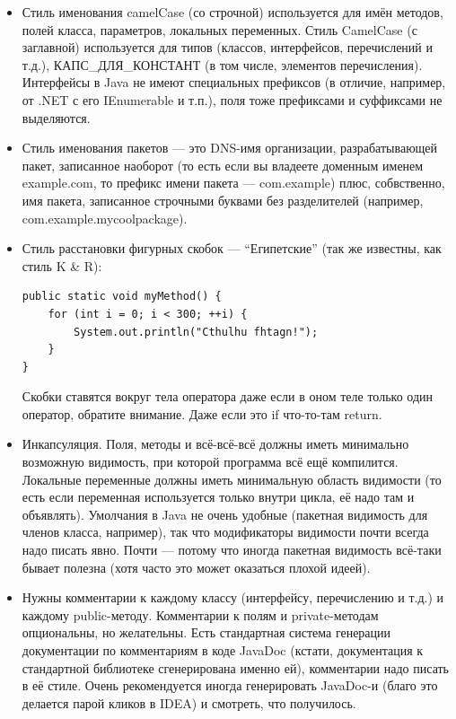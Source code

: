 \documentclass[a5paper]{article}
\begin{document}
\begin{itemize}
	\item Стиль именования camelCase (со строчной) используется для имён методов, полей класса, параметров, локальных переменных. Стиль CamelCase (с заглавной) используется для типов (классов, интерфейсов, перечислений и т.д.), КАПС\_ДЛЯ\_КОНСТАНТ (в том числе, элементов перечисления). Интерфейсы в Java не имеют специальных префиксов (в отличие, например, от .NET с его IEnumerable и т.п.), поля тоже префиксами и суффиксами не выделяются.
	\item Стиль именования пакетов --- это DNS-имя организации, разрабатывающей пакет, записанное наоборот (то есть если вы владеете доменным именем example.com, то префикс имени пакета --- com.example) плюс, собвственно, имя пакета, записанное строчными буквами без разделителей (например, com.example.mycoolpackage).
	\item Стиль расстановки фигурных скобок --- ``Египетские'' (так же известны, как стиль K \& R):
		\begin{verbatim}
public static void myMethod() {
    for (int i = 0; i < 300; ++i) {
        System.out.println("Cthulhu fhtagn!");
    }
}
		\end{verbatim}
		Скобки ставятся вокруг тела оператора даже если в оном теле только один оператор, обратите внимание. Даже если это if что-то-там return.
	\item Инкапсуляция. Поля, методы и всё-всё-всё должны иметь минимально возможную видимость, при которой программа всё ещё компилится. Локальные переменные должны иметь минимальную область видимости (то есть если переменная используется только внутри цикла, её надо там и объявлять). Умолчания в Java не очень удобные (пакетная видимость для членов класса, например), так что модификаторы видимости почти всегда надо писать явно. Почти --- потому что иногда пакетная видимость всё-таки бывает полезна (хотя часто это может оказаться плохой идеей).
	\item Нужны комментарии к каждому классу (интерфейсу, перечислению и т.д.) и каждому public-методу. Комментарии к полям и private-методам опциональны, но желательны. Есть стандартная система генерации документации по комментариям в коде JavaDoc (кстати, документация к стандартной библиотеке сгенерирована именно ей), комментарии надо писать в её стиле. Очень рекомендуется иногда генерировать JavaDoc-и (благо это делается парой кликов в IDEA) и смотреть, что получилось.
\end{itemize}
\end{document}
